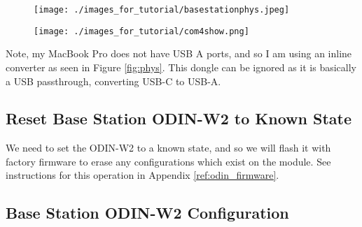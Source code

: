 \documentclass{article}%
\begin{document}
	\begin{figure}
	\centering
	\begin{minipage}{.5\textwidth}
	  \centering
	  \texttt{[image: ./images\_for\_tutorial/basestationphys.jpeg]}
	  \label{fig:phys}
	\end{minipage}%
	\begin{minipage}{.5\textwidth}
	  \centering
	  \texttt{[image: ./images\_for\_tutorial/com4show.png]}
	  \label{fig:com4show}
	\end{minipage}
	\end{figure}
	
	
	\begin{myquote}
		Note, my MacBook Pro does not have USB A ports, and so I am using an inline converter as seen in Figure \ref{fig:phys}. This dongle can be ignored as it is basically a USB passthrough, converting USB-C to USB-A.
	\end{myquote}

\subsection{Reset Base Station ODIN-W2 to Known State}
We need to set the ODIN-W2 to a known state, and so we will flash it with factory firmware to erase any configurations which exist on the module.  See instructions for this operation in Appendix \ref{ref:odin_firmware}.

\subsection{Base Station ODIN-W2 Configuration}
	
\end{document}
